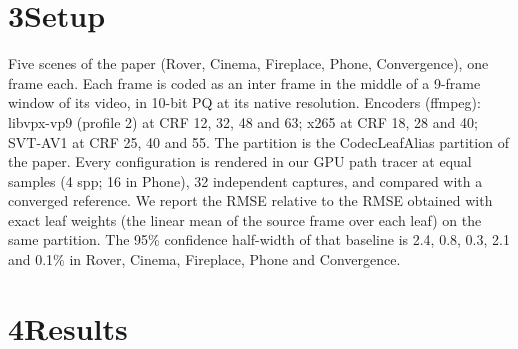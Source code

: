 \documentclass[10pt]{article}
\begin{document}
\section*{3\quad Setup}

Five scenes of the paper (Rover, Cinema, Fireplace, Phone, Convergence), one frame each. Each frame is coded as an inter frame in the middle of a 9-frame window of its video, in 10-bit PQ at its native resolution. Encoders (ffmpeg): libvpx-vp9 (profile 2) at CRF 12, 32, 48 and 63; x265 at CRF 18, 28 and 40; SVT-AV1 at CRF 25, 40 and 55. The partition is the CodecLeafAlias partition of the paper. Every configuration is rendered in our GPU path tracer at equal samples (4 spp; 16 in Phone), 32 independent captures, and compared with a converged reference. We report the RMSE relative to the RMSE obtained with exact leaf weights (the linear mean of the source frame over each leaf) on the same partition. The 95\% confidence half-width of that baseline is 2.4, 0.8, 0.3, 2.1 and 0.1\% in Rover, Cinema, Fireplace, Phone and Convergence.

\section*{4\quad Results}
\end{document}
